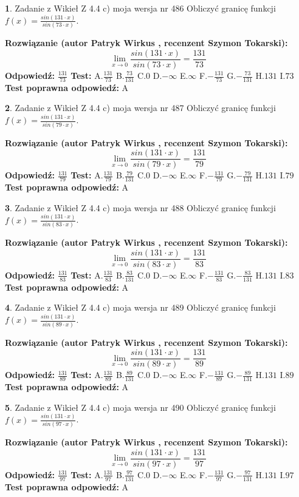 \documentclass[12pt, a4paper]{article}
\theoremstyle{definition} %
\newtheorem{zad}{}
\newcommand{\zadStart}[1]{\begin{zad}#1\newline}
\newcommand{\zadStop}{\end{zad}}
\newcommand{\rozwStart}[2]{\noindent \textbf{Rozwiązanie (autor #1 , recenzent #2): }\newline}
\newcommand{\rozwStop}{\newline}
\newcommand{\odpStart}{\noindent \textbf{Odpowiedź:}\newline}
\newcommand{\odpStop}{\newline}
\newcommand{\testStart}{\noindent \textbf{Test:}\newline}
\newcommand{\testStop}{\newline}
\newcommand{\kluczStart}{\noindent \textbf{Test poprawna odpowiedź:}\newline}
\newcommand{\kluczStop}{\newline}
\begin{document}
\zadStart{Zadanie z Wikieł Z 4.4 c) moja wersja nr 486}
Obliczyć granicę funkcji $f(x)=\frac{sin(131\cdot x)}{sin(73\cdot x)}$.
\zadStop
\rozwStart{Patryk Wirkus}{Szymon Tokarski}
$$\lim\limits_{x\to 0}\frac{sin(131\cdot x)}{sin(73\cdot x)}=
\frac{131}{73}$$
\rozwStop
\odpStart
$\frac{131}{73}$
\odpStop
\testStart
A.$\frac{131}{73}$
B.$\frac{73}{131}$
C.$0$
D.$-\infty$
E.$\infty$
F.$-\frac{131}{73}$
G.$-\frac{73}{131}$
H.$131$
I.$73$
\testStop
\kluczStart
A
\kluczStop



\zadStart{Zadanie z Wikieł Z 4.4 c) moja wersja nr 487}
Obliczyć granicę funkcji $f(x)=\frac{sin(131\cdot x)}{sin(79\cdot x)}$.
\zadStop
\rozwStart{Patryk Wirkus}{Szymon Tokarski}
$$\lim\limits_{x\to 0}\frac{sin(131\cdot x)}{sin(79\cdot x)}=
\frac{131}{79}$$
\rozwStop
\odpStart
$\frac{131}{79}$
\odpStop
\testStart
A.$\frac{131}{79}$
B.$\frac{79}{131}$
C.$0$
D.$-\infty$
E.$\infty$
F.$-\frac{131}{79}$
G.$-\frac{79}{131}$
H.$131$
I.$79$
\testStop
\kluczStart
A
\kluczStop



\zadStart{Zadanie z Wikieł Z 4.4 c) moja wersja nr 488}
Obliczyć granicę funkcji $f(x)=\frac{sin(131\cdot x)}{sin(83\cdot x)}$.
\zadStop
\rozwStart{Patryk Wirkus}{Szymon Tokarski}
$$\lim\limits_{x\to 0}\frac{sin(131\cdot x)}{sin(83\cdot x)}=
\frac{131}{83}$$
\rozwStop
\odpStart
$\frac{131}{83}$
\odpStop
\testStart
A.$\frac{131}{83}$
B.$\frac{83}{131}$
C.$0$
D.$-\infty$
E.$\infty$
F.$-\frac{131}{83}$
G.$-\frac{83}{131}$
H.$131$
I.$83$
\testStop
\kluczStart
A
\kluczStop



\zadStart{Zadanie z Wikieł Z 4.4 c) moja wersja nr 489}
Obliczyć granicę funkcji $f(x)=\frac{sin(131\cdot x)}{sin(89\cdot x)}$.
\zadStop
\rozwStart{Patryk Wirkus}{Szymon Tokarski}
$$\lim\limits_{x\to 0}\frac{sin(131\cdot x)}{sin(89\cdot x)}=
\frac{131}{89}$$
\rozwStop
\odpStart
$\frac{131}{89}$
\odpStop
\testStart
A.$\frac{131}{89}$
B.$\frac{89}{131}$
C.$0$
D.$-\infty$
E.$\infty$
F.$-\frac{131}{89}$
G.$-\frac{89}{131}$
H.$131$
I.$89$
\testStop
\kluczStart
A
\kluczStop



\zadStart{Zadanie z Wikieł Z 4.4 c) moja wersja nr 490}
Obliczyć granicę funkcji $f(x)=\frac{sin(131\cdot x)}{sin(97\cdot x)}$.
\zadStop
\rozwStart{Patryk Wirkus}{Szymon Tokarski}
$$\lim\limits_{x\to 0}\frac{sin(131\cdot x)}{sin(97\cdot x)}=
\frac{131}{97}$$
\rozwStop
\odpStart
$\frac{131}{97}$
\odpStop
\testStart
A.$\frac{131}{97}$
B.$\frac{97}{131}$
C.$0$
D.$-\infty$
E.$\infty$
F.$-\frac{131}{97}$
G.$-\frac{97}{131}$
H.$131$
I.$97$
\testStop
\kluczStart
A
\kluczStop
\end{document}
